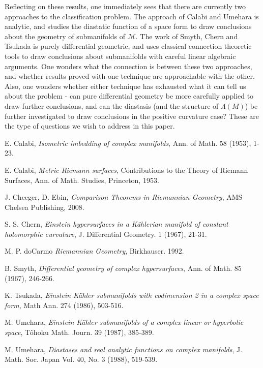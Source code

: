 \documentclass[11pt]{amsart}
\theoremstyle{definition}
\def \Mamb{ \mathcal{M} }
\begin{document}
Reflecting on these results, one immediately sees that there are currently two approaches to the classification problem.  The approach of Calabi and Umehara is analytic, and studies the diastatic function of a space form to draw conclusions about the geometry of submanifolds of $\Mamb$.  The work of Smyth, Chern and Tsukada is purely differential geometric, and uses classical connection theoretic tools to draw conclusions about submanifolds with careful linear algebraic arguments.  One wonders what the connection is between these two approaches, and whether results proved with one technique are approachable with the other.  Also, one wonders whether either technique has exhausted what it can tell us about the problem - can pure differential geometry be more carefully applied to draw further conclusions, and can the diastasis (and the structure of $\Lambda(M)$) be further investigated to draw conclusions in the positive curvature case?  These are the type of questions we wish to address in this paper.
\vfill
\begin{thebibliography}{-1}

\parskip 4pt

 E. Calabi, {\it Isometric imbedding of complex manifolds},
Ann. of Math. 58 (1953), 1-23.

\smallskip

 E. Calabi, {\it Metric Riemann surfaces},
Contributions to the Theory of Riemann Surfaces, Ann. of Math.
Studies, Princeton, 1953.

\smallskip

 J. Cheeger, D. Ebin, {\it Comparison Theorems in Riemannian Geometry}, AMS Chelsea Publishing, 2008.

\smallskip

 S. S. Chern, {\it Einstein hypersurfaces in a K\"ahlerian manifold of constant
holomorphic curvature}, J. Differential Geometry. 1 (1967), 21-31.

\smallskip

 M. P. doCarmo {\it Riemannian Geometry}, Birkhauser. 1992. 

\smallskip

 B. Smyth, {\it Differential geometry of complex hypersurfaces},
Ann. of Math. 85 (1967), 246-266.

\smallskip

 K. Tsukada, {\it Einstein K\"ahler submanifolds with codimension 2 in a complex space form},
Math Ann. 274 (1986), 503-516.

\smallskip

 M. Umehara, {\it Einstein K\"ahler submanifolds of
a complex linear or hyperbolic space}, T\^{o}hoku Math. Journ. 39
(1987), 385-389.

\smallskip

 M. Umehara, {\it Diastases and real analytic functions on complex
manifolds}, J. Math. Soc. Japan Vol. 40, No. 3 (1988), 519-539.


\end{thebibliography}
\bigskip
\end{document}
